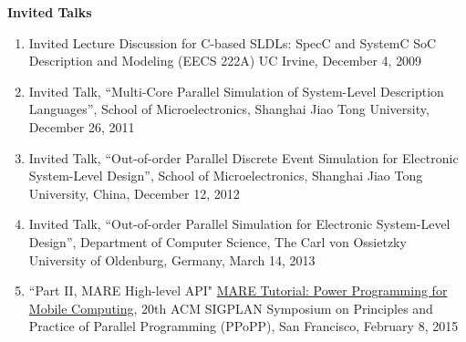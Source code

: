 \textbf{\large Invited Talks}\\
\vspace{-2mm}
\begin{enumerate}
\item
	\mypub
	{Invited Lecture}
	{Discussion for C-based SLDLs: SpecC and SystemC} 
	{}
	{SoC Description and Modeling (EECS 222A)}
	{UC Irvine, December 4, 2009}
	
	
	
\item Invited Talk, ``Multi-Core Parallel Simulation of System-Level Description Languages'', School of Microelectronics, Shanghai Jiao Tong University, December 26, 2011
	
	
	
\item Invited Talk, ``Out-of-order Parallel Discrete Event Simulation for Electronic System-Level Design'', School of Microelectronics, Shanghai Jiao Tong University, China, December 12, 2012

\item Invited Talk, ``Out-of-order Parallel Simulation for Electronic System-Level Design'', Department of Computer Science, The Carl von Ossietzky University of Oldenburg, Germany, March 14, 2013

\item ``Part II, MARE High-level API"  \href{https://sites.google.com/site/maretutorial2015/}{MARE Tutorial: Power Programming for Mobile Computing}, 20th ACM SIGPLAN Symposium on Principles and Practice of Parallel Programming (PPoPP), San Francisco, February 8, 2015 

\end{enumerate}
